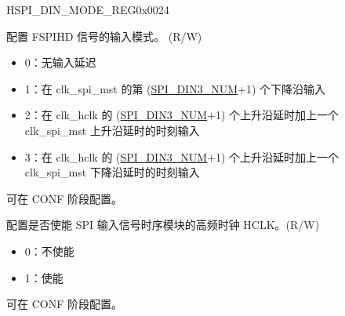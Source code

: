 \addtocounter{Regfloat}{-1}
\begin{register}{H}{SPI\_DIN\_MODE\_REG}{0x0024}
\begin{regdesc}\begin{reglist}
\item [接上页]
\label{fielddesc:SPIDIN3MODE}\item [SPI\_DIN3\_MODE] 配置 FSPIHD 信号的输入模式。 (R/W)
\begin{itemize}
    \item 0：无输入延迟
    \item 1：在 clk\_spi\_mst 的第 (\hyperref[fielddesc:SPIDIN3NUM]{SPI\_DIN3\_NUM}+1) 个下降沿输入
    \item 2：在 clk\_hclk 的 (\hyperref[fielddesc:SPIDIN3NUM]{SPI\_DIN3\_NUM}+1) 个上升沿延时加上一个 clk\_spi\_mst 上升沿延时的时刻输入
    \item 3：在 clk\_hclk 的 (\hyperref[fielddesc:SPIDIN3NUM]{SPI\_DIN3\_NUM}+1) 个上升沿延时加上一个 clk\_spi\_mst 下降沿延时的时刻输入
\end{itemize}
可在 CONF 阶段配置。

\label{fielddesc:SPITIMINGHCLKACTIVE}\item [SPI\_TIMING\_HCLK\_ACTIVE] 配置是否使能 SPI 输入信号时序模块的高频时钟 HCLK。(R/W)
\begin{itemize}
    \item 0：不使能
    \item 1：使能
\end{itemize}
可在 CONF 阶段配置。 
\end{reglist}\end{regdesc}
\end{register}


